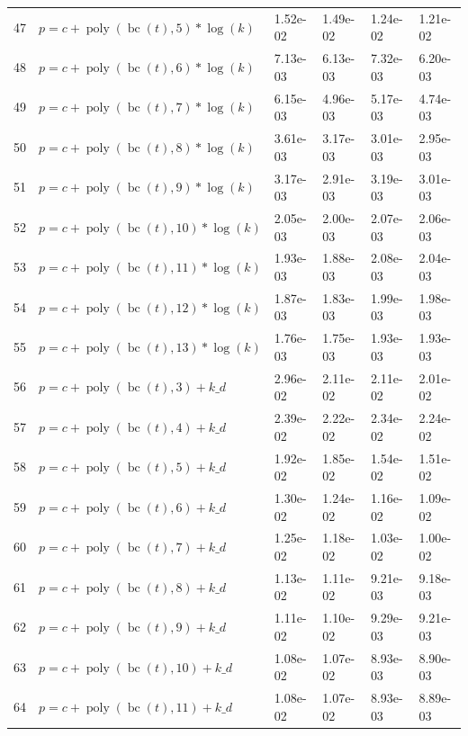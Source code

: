 \documentclass[12pt,a4paper]{article}
\DeclareMathOperator{\bc}{bc}
\DeclareMathOperator{\poly}{poly}
\begin{document}
\begin{longtable}[t]{ll>{\raggedleft\arraybackslash}p{2cm}>{\raggedleft\arraybackslash}p{2cm}>{\raggedleft\arraybackslash}p{2cm}>{\raggedleft\arraybackslash}p{2cm}}
\rowcolor{gray!6}  47 & $p = c + \poly\left( \bc(t), 5 \right) * \log(k)$ & 1.52e-02 & 1.49e-02 & 1.24e-02 & 1.21e-02\\
48 & $p = c + \poly\left( \bc(t), 6 \right) * \log(k)$ & 7.13e-03 & 6.13e-03 & 7.32e-03 & 6.20e-03\\
\rowcolor{gray!6}  49 & $p = c + \poly\left( \bc(t), 7 \right) * \log(k)$ & 6.15e-03 & 4.96e-03 & 5.17e-03 & 4.74e-03\\
50 & $p = c + \poly\left( \bc(t), 8 \right) * \log(k)$ & 3.61e-03 & 3.17e-03 & 3.01e-03 & 2.95e-03\\
\rowcolor{gray!6}  51 & $p = c + \poly\left( \bc(t), 9 \right) * \log(k)$ & 3.17e-03 & 2.91e-03 & 3.19e-03 & 3.01e-03\\
52 & $p = c + \poly\left( \bc(t), 10 \right) * \log(k)$ & 2.05e-03 & 2.00e-03 & 2.07e-03 & 2.06e-03\\
\rowcolor{gray!6}  53 & $p = c + \poly\left( \bc(t), 11 \right) * \log(k)$ & 1.93e-03 & 1.88e-03 & 2.08e-03 & 2.04e-03\\
54 & $p = c + \poly\left( \bc(t), 12 \right) * \log(k)$ & 1.87e-03 & 1.83e-03 & 1.99e-03 & 1.98e-03\\
\rowcolor{gray!6}  55 & $p = c + \poly\left( \bc(t), 13 \right) * \log(k)$ & 1.76e-03 & 1.75e-03 & 1.93e-03 & 1.93e-03\\
56 & $p = c + \poly\left( \bc(t), 3 \right) + k\_d$ & 2.96e-02 & 2.11e-02 & 2.11e-02 & 2.01e-02\\
\rowcolor{gray!6}  57 & $p = c + \poly\left( \bc(t), 4 \right) + k\_d$ & 2.39e-02 & 2.22e-02 & 2.34e-02 & 2.24e-02\\
58 & $p = c + \poly\left( \bc(t), 5 \right) + k\_d$ & 1.92e-02 & 1.85e-02 & 1.54e-02 & 1.51e-02\\
\rowcolor{gray!6}  59 & $p = c + \poly\left( \bc(t), 6 \right) + k\_d$ & 1.30e-02 & 1.24e-02 & 1.16e-02 & 1.09e-02\\
60 & $p = c + \poly\left( \bc(t), 7 \right) + k\_d$ & 1.25e-02 & 1.18e-02 & 1.03e-02 & 1.00e-02\\
\rowcolor{gray!6}  61 & $p = c + \poly\left( \bc(t), 8 \right) + k\_d$ & 1.13e-02 & 1.11e-02 & 9.21e-03 & 9.18e-03\\
62 & $p = c + \poly\left( \bc(t), 9 \right) + k\_d$ & 1.11e-02 & 1.10e-02 & 9.29e-03 & 9.21e-03\\
\rowcolor{gray!6}  63 & $p = c + \poly\left( \bc(t), 10 \right) + k\_d$ & 1.08e-02 & 1.07e-02 & 8.93e-03 & 8.90e-03\\
64 & $p = c + \poly\left( \bc(t), 11 \right) + k\_d$ & 1.08e-02 & 1.07e-02 & 8.93e-03 & 8.89e-03\\

\end{longtable}
\end{document}
